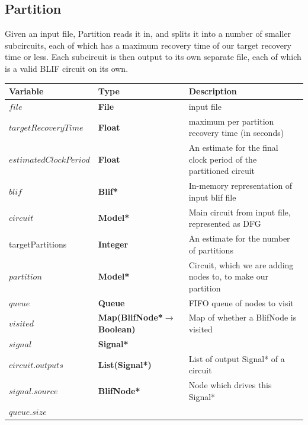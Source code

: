 \documentclass[12pt,final,oneside]{dwThesis} %
\begin{document}
   \subsection{Partition}
   \label{algPartition} Given an input file,
   Partition reads it in, and splits it into a number of smaller subcircuits,
   each of which has a maximum recovery time of our target recovery time or
   less. Each subcircuit is then output to its own separate file, each of which
   is a valid \gls{BLIF} circuit on its own.  
   \begin{table}

      \begin{center}


         \begin{tabularx}
            {\linewidth}{llX} \toprule Variable & Type &
            Description\\
            \midrule $file$ &\textbf{ File  } &  input file\\
            $targetRecoveryTime$ &\textbf{ Float } &  maximum per partition
            recovery time (in seconds)\\
            $estimatedClockPeriod$ &\textbf{Float} & An estimate for the final clock period of the partitioned circuit\\
            $blif$ &\textbf{  Blif* } &  In-memory
            representation of input blif file\\
            $circuit$ &\textbf{   Model* }
            &  Main circuit from input file, represented as DFG\\
            targetPartitions & \textbf{Integer} & An estimate for the number of partitions \\
            $partition$
            &\textbf{   Model* } &  Circuit, which we are adding nodes to, to
            make our partition\\
            $queue$ &\textbf{  Queue } &  FIFO queue of
            nodes to visit\\
            $visited$ &\textbf{   Map(BlifNode*$\to$ Boolean)}
            &  Map of whether a BlifNode is visited\\
            $signal$ &\textbf{
               Signal* } &  \\
            $circuit.outputs$ &\textbf{  List(Signal*) } &
            List of output Signal* of a circuit\\
            $signal.source$ &\textbf{
               BlifNode* } &  Node which drives this Signal*\\
            $queue.size$

\end{tabularx}
\end{center}
\end{table}
\end{document}
